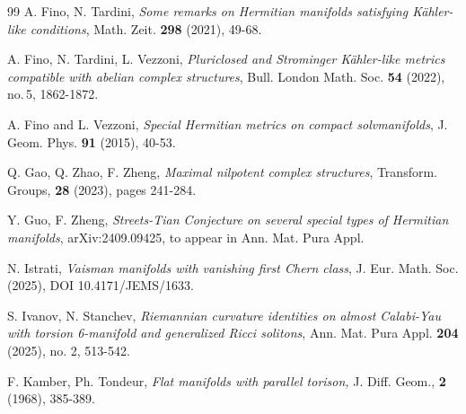 \documentclass{amsart}
\numberwithin{equation}{section}
\theoremstyle{definition}
\renewcommand{\1}{\mathds{1}}
\renewcommand{\>}{\rightarrow}
\begin{document}
\begin{thebibliography}{99}
 A. Fino, N. Tardini,
\newblock \textit{Some remarks on Hermitian manifolds satisfying K\"ahler-like conditions},
\newblock Math. Zeit. \textbf{298} (2021), 49-68.

 A. Fino, N. Tardini, L. Vezzoni,
\newblock \textit{Pluriclosed and Strominger K\"ahler-like metrics compatible with abelian complex structures},
\newblock Bull. London Math. Soc. \textbf{54} (2022), no.\,5, 1862-1872.

 A. Fino and L. Vezzoni,
\newblock \textit{Special Hermitian metrics on compact solvmanifolds},
\newblock J. Geom. Phys. {\bf 91} (2015), 40-53.



 Q. Gao, Q. Zhao, F. Zheng,
\newblock \textit{Maximal nilpotent complex structures},
\newblock Transform. Groups, \textbf{28} (2023), pages 241-284.




 Y. Guo, F. Zheng,
\newblock \textit{Streets-Tian Conjecture on several special types of Hermitian manifolds},
\newblock arXiv:2409.09425, to appear in Ann. Mat. Pura Appl.




 N. Istrati,
\newblock \textit{Vaisman manifolds with vanishing first Chern class},
\newblock J. Eur. Math. Soc. (2025), DOI 10.4171/JEMS/1633.

 S. Ivanov, N. Stanchev,
\newblock \textit{Riemannian curvature identities on almost Calabi-Yau with torsion 6-manifold and generalized Ricci solitons},
\newblock Ann. Mat. Pura Appl. \textbf{204} (2025), no. 2, 513-542.


 F. Kamber, Ph. Tondeur,
\newblock \textit{Flat manifolds with parallel torison,}
\newblock J. Diff. Geom., \textbf{2} (1968), 385-389.


\end{thebibliography}
\end{document}

